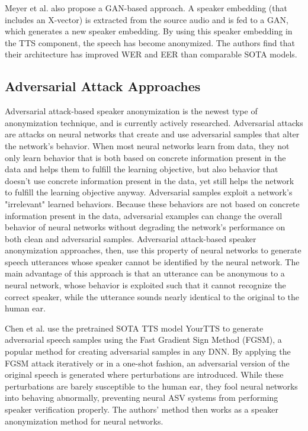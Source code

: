 \documentclass{Interspeech2024}
\begin{document}
Meyer et al. \cite{meyer_2023_adversarial_gan} also propose a GAN-based approach. 
A speaker embedding (that includes an X-vector) is extracted from the source audio and is fed to a GAN, which generates a new speaker embedding. 
By using this speaker embedding in the TTS component, the speech has become anonymized. 
The authors find that their architecture has improved WER and EER than comparable SOTA models.

\subsection{Adversarial Attack Approaches}
Adversarial attack-based speaker anonymization is the newest type of anonymization technique, and is currently actively researched.
Adversarial attacks are attacks on neural networks that create and use adversarial samples that alter the network's behavior.
When most neural networks learn from data, they not only learn behavior that is both based on concrete information present in the data and helps them to fulfill the learning objective, but also behavior that doesn't use concrete information present in the data, yet still helps the network to fulfill the learning objective anyway.
Adversarial samples exploit a network's "irrelevant" learned behaviors.
Because these behaviors are not based on concrete information present in the data, adversarial examples can change the overall behavior of neural networks without degrading the network's performance on both clean and adversarial samples.
Adversarial attack-based speaker anonymization approaches, then, use this property of neural networks to generate speech utterances whose speaker cannot be identified by the neural network.
The main advantage of this approach is that an utterance can be anonymous to a neural network, whose behavior is exploited such that it cannot recognize the correct speaker, while the utterance sounds nearly identical to the original to the human ear.

Chen et al. \cite{chen_2024_adversarial_yourtts} use the pretrained SOTA TTS model YourTTS to generate adversarial speech samples using the Fast Gradient Sign Method (FGSM), a popular method for creating adversarial samples in any DNN. 
By applying the FGSM attack iteratively or in a one-shot fashion, an adversarial version of the original speech is generated where perturbations are introduced. 
While these perturbations are barely susceptible to the human ear, they fool neural networks into behaving abnormally, preventing neural ASV systems from performing speaker verification properly. 
The authors' method then works as a speaker anonymization method for neural networks.
\end{document}
